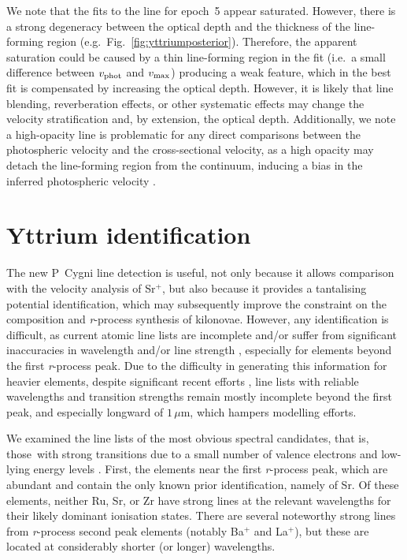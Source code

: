 \documentclass{aa}
\newcommand{\rproc}{\textit{r}-process\xspace}
\begin{document}
We note that the fits to the line for epoch~5 appear saturated. However, there is a strong degeneracy between the optical depth and the thickness of the line-forming region (e.g.\ Fig.~\ref{fig:yttriumposterior}). Therefore, the apparent saturation could be caused by a thin line-forming region in the fit (i.e.\ a small difference between $v_{\rm phot}$ and $v_{\rm max}$) producing a weak feature, which in the best fit is compensated by increasing the optical depth. However, it is likely that line blending, reverberation effects, or other systematic effects may change the velocity stratification and, by extension, the optical depth. Additionally, we note a high-opacity line is problematic for any direct comparisons between the photospheric velocity and the cross-sectional velocity, as a high opacity may detach the line-forming region from the continuum, inducing a bias in the inferred photospheric velocity \citep{Sim2017}.

\section{Yttrium identification}
\label{sec:line-id}
The new P~Cygni line detection is useful, not only because it allows comparison with the velocity analysis of Sr\(^+\), but also because it provides a tantalising potential identification, which may subsequently improve the constraint on the composition and \rproc synthesis of kilonovae. However, any identification is difficult, as current atomic line lists are incomplete and/or suffer from significant inaccuracies in wavelength and/or line strength \citep[e.g. VALD, Kurucz;][respectively]{Ryabchikova2015,Kurucz2018}, especially for elements beyond the first \rproc peak. Due to the difficulty in generating this information for heavier elements, despite significant recent efforts \citep[e.g.][]{Tanaka2020}, line lists with reliable wavelengths and transition strengths remain mostly incomplete beyond the first peak, and especially longward of $1\,\mu$m, which hampers modelling efforts. 

We examined the line lists of the most obvious spectral candidates, that is, those\ with strong transitions due to a small number of valence electrons and low-lying energy levels \citep{Watson2019,Domoto2022}. First, the elements near the first \rproc peak, which are abundant and contain the only known prior identification, namely of Sr. Of these elements, neither Ru, Sr, or Zr have strong lines at the relevant wavelengths for their likely dominant ionisation states. There are several noteworthy strong lines from \rproc second peak elements (notably Ba\(^+\) and La\(^+\)), but these are located at considerably shorter (or longer) wavelengths.
\end{document}
